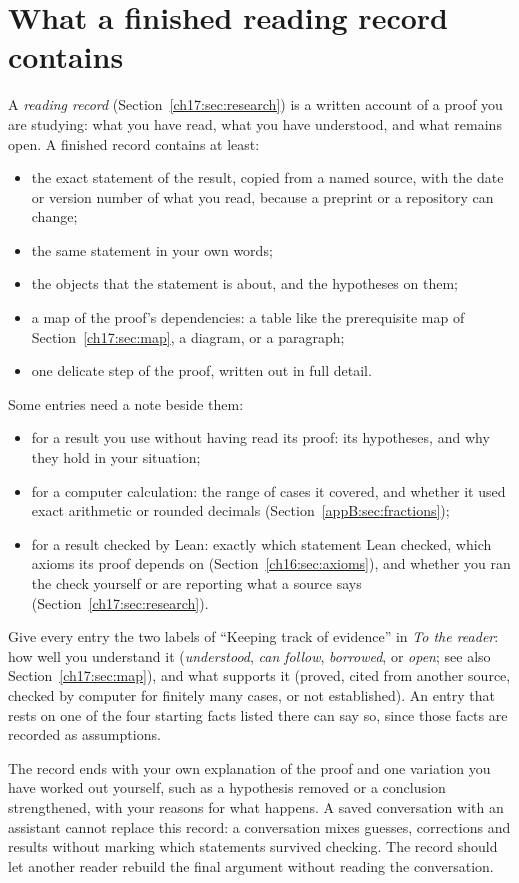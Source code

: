 \section{What a finished reading record contains}\label{appC:sec:record}
A \emph{reading record} (Section~\ref{ch17:sec:research}) is a written account of a proof you are studying: what you have read, what you have understood, and what remains open. A finished record contains at least:
\begin{itemize}
\item the exact statement of the result, copied from a named source, with the date or version number of what you read, because a preprint or a repository can change;
\item the same statement in your own words;
\item the objects that the statement is about, and the hypotheses on them;
\item a map of the proof's dependencies: a table like the prerequisite map of Section~\ref{ch17:sec:map}, a diagram, or a paragraph;
\item one delicate step of the proof, written out in full detail.
\end{itemize}
Some entries need a note beside them:
\begin{itemize}
\item for a result you use without having read its proof: its hypotheses, and why they hold in your situation;
\item for a computer calculation: the range of cases it covered, and whether it used exact arithmetic or rounded decimals (Section~\ref{appB:sec:fractions});
\item for a result checked by Lean: exactly which statement Lean checked, which axioms its proof depends on (Section~\ref{ch16:sec:axioms}), and whether you ran the check yourself or are reporting what a source says (Section~\ref{ch17:sec:research}).
\end{itemize}

Give every entry the two labels of ``Keeping track of evidence'' in \emph{To the reader}: how well you understand it (\emph{understood}, \emph{can follow}, \emph{borrowed}, or \emph{open}; see also Section~\ref{ch17:sec:map}), and what supports it (proved, cited from another source, checked by computer for finitely many cases, or not established). An entry that rests on one of the four starting facts listed there can say so, since those facts are recorded as assumptions.

The record ends with your own explanation of the proof and one variation you have worked out yourself, such as a hypothesis removed or a conclusion strengthened, with your reasons for what happens. A saved conversation with an assistant cannot replace this record: a conversation mixes guesses, corrections and results without marking which statements survived checking. The record should let another reader rebuild the final argument without reading the conversation.
